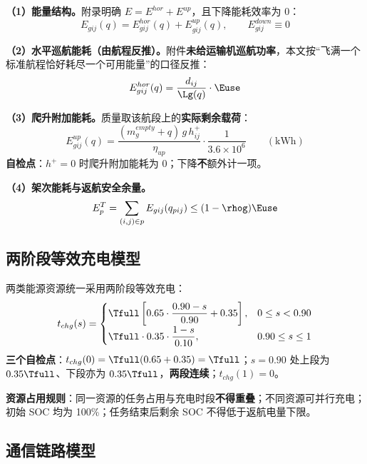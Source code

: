 \textbf{（1）能量结构。}附录明确 $E=E^{hor}+E^{up}$，且下降能耗效率为 0：
\begin{equation}
	E_{gij}(q)=E_{gij}^{hor}(q)+E_{gij}^{up}(q),
	\qquad E_{gij}^{down}\equiv 0
	\label{eq:ecomp}
\end{equation}

\textbf{（2）水平巡航能耗（由航程反推）。}附件\textbf{未给运输机巡航功率}，本文按“飞满一个标准航程恰好耗尽一个可用能量”的口径反推：
\begin{equation}
	E_{gij}^{hor}(q)=\frac{d_{ij}}{\Lg(q)}\cdot \Euse
	\label{eq:ehov}
\end{equation}

\textbf{（3）爬升附加能耗。}质量取该航段上的\textbf{实际剩余载荷}：
\begin{equation}
	E_{gij}^{up}(q)=\frac{(m_{g}^{empty}+q)\,g\,h_{ij}^{+}}{\eta_{up}}\cdot\frac{1}{3.6\times10^{6}}
	\qquad(\text{kWh})
	\label{eq:eup}
\end{equation}
\textbf{自检点}：$h^{+}=0$ 时爬升附加能耗为 0；下降\textbf{不}额外计一项。

\textbf{（4）架次能耗与返航安全余量。}
\begin{equation}
	E_{p}^{T}=\sum_{(i,j)\in p}E_{gij}(q_{pij})\le(1-\rhog)\Euse
	\label{eq:sortieen}
\end{equation}

\subsection{两阶段等效充电模型}

两类能源资源统一采用两阶段等效充电：
\begin{equation}
	t_{chg}(s)=
	\begin{cases}
		\Tfull\left[0.65\cdot\dfrac{0.90-s}{0.90}+0.35\right], & 0\le s<0.90\\[6pt]
		\Tfull\cdot 0.35\cdot\dfrac{1-s}{0.10},                & 0.90\le s\le 1
	\end{cases}
	\label{eq:charge}
\end{equation}
\textbf{三个自检点}：$t_{chg}(0)=\Tfull(0.65+0.35)=\Tfull$；$s=0.90$ 处上段为 $0.35\Tfull$、下段亦为 $0.35\Tfull$，\textbf{两段连续}；$t_{chg}(1)=0$。

\textbf{资源占用规则}：同一资源的任务占用与充电时段\textbf{不得重叠}；不同资源可并行充电；初始 SOC 均为 100\%；任务结束后剩余 SOC 不得低于返航电量下限。

\subsection{通信链路模型}\label{sec:comms}


